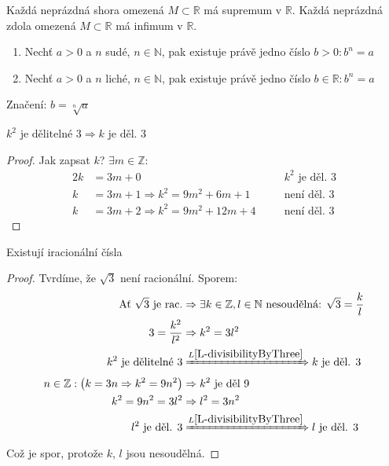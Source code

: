\begin{definitionAi}\label{D-A3}
	Každá neprázdná shora omezená $M\subset\mathbb{R}$ má supremum v $\mathbb{R}$.
	Každá neprázdná zdola omezená $M\subset\mathbb{R}$ má infimum v $\mathbb{R}$.
\end{definitionAi}

\begin{definition}[Odmocnina]
	\begin{enumerate}
		\item Nechť $a>0$ a $n$ sudé, $n\in\mathbb{N}$, pak existuje právě jedno číslo $b>0: b^n=a$
		\item Nechť $a>0$ a $n$ liché, $n\in\mathbb{N}$, pak existuje právě jedno číslo $b\in\mathbb{R}: b^n=a$
	\end{enumerate}
	Značení: $b=\sqrt[n]{a}$
\end{definition}

\begin{lemmaAlph}\label{L-divisibilityByThree}
	$k^2 \text{ je dělitelné }3\Rightarrow k \text{ je děl. }3$
\end{lemmaAlph}
\begin{proof}
	Jak zapsat $k$? $\exists m\in\mathbb{Z}:$
	\begin{alignat}{2}
		k &= 3m+0 &&k^2\text{ je děl. $3$}\\
		k &= 3m+1 \Rightarrow k^2=9m^2+6m+1 \quad&&\text{není děl. $3$} \\
		k &= 3m+2 \Rightarrow k^2=9m^2+12m+4 \quad&&\text{není děl. $3$}
	\end{alignat}
\end{proof}

\begin{theorem}
	Existují iracionální čísla
\end{theorem}
\begin{proof}
	Tvrdíme, že $\sqrt{3}$ není racionální. Sporem:
	\begin{alignat}{1}
		\text{Ať $\sqrt{3}$ je rac.} &\Rightarrow\exists k\in\mathbb{Z}, l\in\mathbb{N}
		\text{ nesoudělná: }\sqrt{3}=\frac{k}{l} \\
		3=\frac{k^2}{l^2} &\Rightarrow k^2=3l^2 \\
		k^2 \text{ je dělitelné }3 &\xRightarrow{L\ref{L-divisibilityByThree}} k\text{ je děl. }3 \\
		n\in\mathbb{Z}: \left(k=3n\Rightarrow k^2=9n^2\right) &\Rightarrow k^2 \text{ je děl }9 \\
		k^2=9n^2=3l^2 &\Rightarrow l^2=3n^2 \\
		l^2 \text{ je děl. }3 &\xRightarrow{L\ref{L-divisibilityByThree}} l\text{ je děl. }3
	\end{alignat}
	Což je spor, protože $k$, $l$ jsou nesoudělná.
\end{proof}

